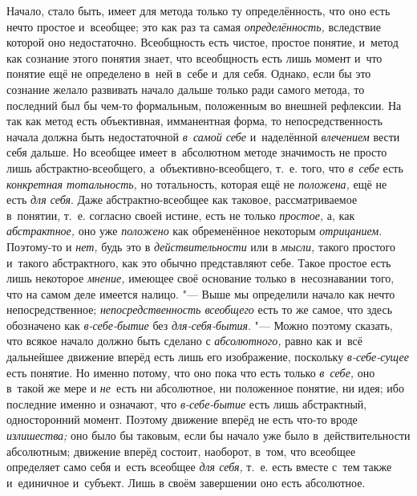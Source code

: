 Начало, стало быть, имеет для метода только ту определённость, что оно
есть нечто простое и~всеобщее; это как раз та самая {\em определённость,}
вследствие которой оно недостаточно. Всеобщность есть чистое,
простое понятие, и~метод как сознание этого понятия знает, что всеобщность
есть лишь момент и~что понятие ещё не определено в~ней в~себе и~для себя.
Однако, если бы это сознание желало развивать начало дальше только ради
самого метода, то последний был бы чем-то формальным, положенным во внешней
рефлексии. На так как метод есть объективная, имманентная форма, то
непосредственность начала должна быть недостаточной
{\em в~самой себе} и~наделённой {\em влечением}
вести себя дальше. Но всеобщее имеет в~абсолютном методе
значимость не просто лишь абстрактно-всеобщего, а~объективно-всеобщего,
т.~е. того, что {\em в~себе} есть {\em конкретная
тотальность,} но тотальность, которая ещё не
{\em положена,} ещё не есть {\em для себя}. Даже
абстрактно-всеобщее как таковое, рассматриваемое в~понятии, т.~е. согласно
своей истине, есть не только {\em простое,} а, как {\em абстрактное,} оно
уже {\em положено} как обременённое некоторым {\em отрицанием}.
Поэтому-то и {\em нет,} будь это в {\em действительности} или в {\em мысли,}
такого простого и~такого абстрактного, как это обычно
представляют себе. Такое простое есть лишь некоторое {\em мнение,} имеющее
своё основание только в~несознавании того, что на самом деле имеется
налицо. "--- Выше мы определили начало как нечто непосредственное;
{\em непосредственность всеобщего}
есть то же самое, что здесь обозначено как
{\em в-себе-бытие} без {\em для-себя-бытия}. "--- Можно поэтому
сказать, что всякое начало должно быть сделано с {\em абсолютного,}
равно как и~всё дальнейшее движение вперёд есть лишь его
изображение, поскольку {\em в-себе-сущее} есть
понятие. Но именно потому, что оно пока что есть только
{\em в~себе,} оно в~такой же мере и {\em не}~есть
ни абсолютное, ни положенное понятие, ни идея; ибо последние именно и
означают, что {\em в-себе-бытие}
есть лишь абстрактный, односторонний момент. Поэтому движение
вперёд не есть что-то вроде {\em излишества;} оно
было бы таковым, если бы начало уже было в~действительности абсолютным;
движение вперёд состоит, наоборот, в~том, что всеобщее определяет само себя
и~есть всеобщее {\em для себя,}
т.~е. есть вместе с~тем также и~единичное и~субъект. Лишь в
своём завершении оно есть абсолютное.

